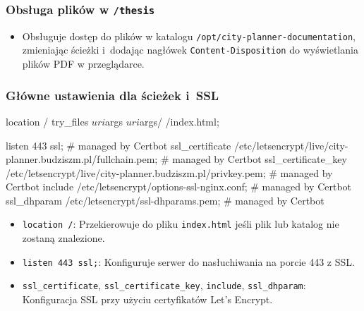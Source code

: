 \subsubsection{Obsługa plików w \texttt{/thesis}}
\begin{itemize}
    \item Obsługuje dostęp do plików w katalogu \texttt{/opt/city-planner-documentation}, zmieniając ścieżki i~dodając nagłówek \texttt{Content-Disposition} do wyświetlania plików PDF w przeglądarce.
\end{itemize}

\subsubsection{Główne ustawienia dla ścieżek i~SSL}
\begin{longlisting}[language=nginx,label={lst:n7}]
  location / {
    try_files $uri$args $uri$args/ /index.html;
  }

  listen 443 ssl; # managed by Certbot
  ssl_certificate /etc/letsencrypt/live/city-planner.budziszm.pl/fullchain.pem; # managed by Certbot
  ssl_certificate_key /etc/letsencrypt/live/city-planner.budziszm.pl/privkey.pem; # managed by Certbot
  include /etc/letsencrypt/options-ssl-nginx.conf; # managed by Certbot
  ssl_dhparam /etc/letsencrypt/ssl-dhparams.pem; # managed by Certbot
\end{longlisting}
\begin{itemize}
    \item \texttt{location /}: Przekierowuje do pliku \texttt{index.html} jeśli plik lub katalog nie zostaną znalezione.
    \item \texttt{listen 443 ssl;}: Konfiguruje serwer do nasłuchiwania na porcie 443 z SSL\@.
    \item \texttt{ssl\_certificate}, \texttt{ssl\_certificate\_key}, \texttt{include}, \texttt{ssl\_dhparam}: Konfiguracja SSL przy użyciu certyfikatów Let's Encrypt.
\end{itemize}


